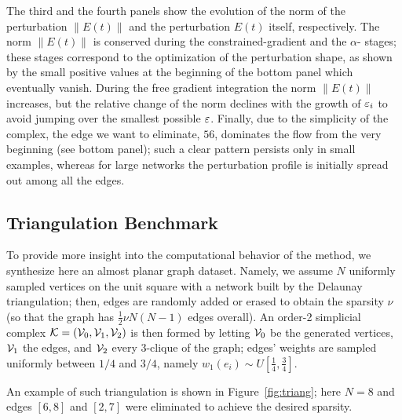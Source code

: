 The third and the fourth panels show the evolution of the norm of the perturbation $\| E(t) \|$ and the perturbation $E(t)$ itself, respectively.  The norm $\| E(t) \| $ is conserved during the constrained-gradient and the $\alpha$- stages; these stages correspond to the optimization of the perturbation shape, as shown by the small positive values at the beginning of the bottom panel which eventually vanish. During the free gradient integration the norm $\| E(t) \|$ increases, but the relative change of the norm declines with the growth of $\varepsilon_i$ to avoid jumping over the smallest possible $\varepsilon$. Finally, due to the simplicity of the complex, the  edge we want to eliminate, $56$, dominates the flow from the very beginning (see bottom panel); such a clear pattern persists only in small examples, whereas for large networks the perturbation profile is initially spread out among all the edges.


\subsection{Triangulation Benchmark}

To provide more insight into the computational behavior of the method, we synthesize here an almost planar 
graph dataset. Namely, we assume $N$ uniformly sampled vertices on the unit square with a network built by the Delaunay triangulation;  then, edges are randomly added or erased to obtain the sparsity $\nu$  (so that the graph has $\frac 12  \nu N(N-1)$ edges overall). An order-2 simplicial complex $\mathcal{K}=(\mathcal{V}_0,\mathcal{V}_1,\mathcal{V}_2)$  is then formed by letting $\mathcal{V}_0$ be the generated vertices, $\mathcal{V}_1$ the edges, and $\mathcal{V}_2$ every $3$-clique of the graph; edges' weights are sampled uniformly between $1/4$ and $3/4$, namely $w_1(e_i) \sim U [\frac{1}{4}, \frac{3}{4} ]$.


An  example of such triangulation is shown in Figure~\ref{fig:triang}; here $N=8$ and edges $[6, 8]$ and $[2, 7]$ were eliminated to achieve the desired sparsity.


